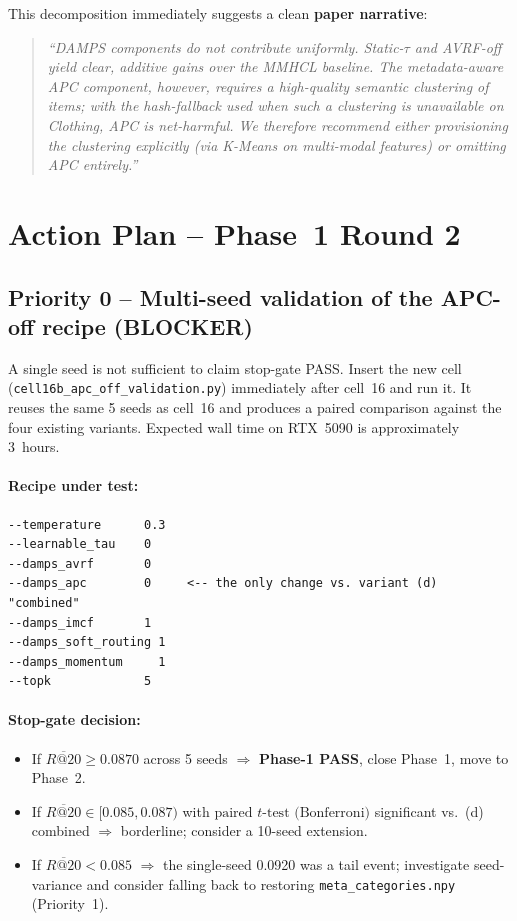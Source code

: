 \documentclass[11pt,a4paper]{article}
\begin{document}
This decomposition immediately suggests a clean \textbf{paper narrative}:

\begin{quote}\itshape
\small
``DAMPS components do not contribute uniformly. Static-$\tau$ and AVRF-off
yield clear, additive gains over the MMHCL baseline. The metadata-aware
APC component, however, requires a high-quality semantic clustering of
items; with the hash-fallback used when such a clustering is unavailable
on Clothing, APC is net-harmful. We therefore recommend either
provisioning the clustering explicitly (via K-Means on multi-modal
features) or omitting APC entirely.''
\end{quote}

\section{Action Plan -- Phase~1 Round 2}

\subsection*{Priority 0 -- Multi-seed validation of the APC-off recipe (BLOCKER)}

A single seed is not sufficient to claim stop-gate PASS. Insert the new
cell (\texttt{cell16b\_apc\_off\_validation.py}) immediately after cell~16
and run it. It reuses the same 5 seeds as cell~16 and produces a paired
comparison against the four existing variants. Expected wall time on
RTX~5090 is approximately 3~hours.

\paragraph{Recipe under test:}
\begin{lstlisting}
--temperature      0.3
--learnable_tau    0
--damps_avrf       0
--damps_apc        0     <-- the only change vs. variant (d) "combined"
--damps_imcf       1
--damps_soft_routing 1
--damps_momentum     1
--topk             5
\end{lstlisting}

\paragraph{Stop-gate decision:}
\begin{itemize}[leftmargin=*]
\item If $\overline{R@20} \geq 0.0870$ across 5 seeds $\Rightarrow$
      \textbf{Phase-1 PASS}, close Phase~1, move to Phase~2.
\item If $\overline{R@20} \in [0.085, 0.087)$ with $\text{paired }
      t\text{-test (Bonferroni)}$ significant vs.\ (d) combined
      $\Rightarrow$ borderline; consider a 10-seed extension.
\item If $\overline{R@20} < 0.085$ $\Rightarrow$ the single-seed 0.0920
      was a tail event; investigate seed-variance and consider falling
      back to restoring \texttt{meta\_categories.npy} (Priority~1).
\end{itemize}
\end{document}
